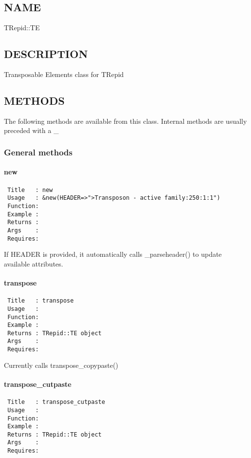 \subsection{NAME\label{NAME}}


TRepid::TE

\subsection{DESCRIPTION\label{DESCRIPTION}}


Transposable Elements class for TRepid

\subsection{METHODS\label{METHODS}}


The following methods are available from this class. Internal methods
are usually preceded with a \_

\subsubsection*{General methods\label{General_methods}}
\paragraph*{new\label{new}}
\begin{verbatim}
 Title   : new
 Usage   : &new(HEADER=>">Transposon - active family:250:1:1")
 Function: 
 Example :
 Returns :
 Args    :
 Requires:
\end{verbatim}


If HEADER is provided, it automatically calls \_parseheader() to update
available attributes.

\paragraph*{transpose\label{transpose}}
\begin{verbatim}
 Title   : transpose
 Usage   :
 Function: 
 Example :
 Returns : TRepid::TE object
 Args    :
 Requires:
\end{verbatim}


Currently calls transpose\_copypaste()

\paragraph*{transpose\_cutpaste\label{transpose_cutpaste}}
\begin{verbatim}
 Title   : transpose_cutpaste
 Usage   :
 Function: 
 Example :
 Returns : TRepid::TE object
 Args    :
 Requires:
\end{verbatim}


